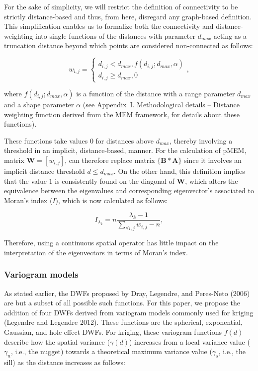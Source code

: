 \documentclass[
]{article}
\begin{document}
For the sake of simplicity, we will restrict the definition of
connectivity to be strictly distance-based and thus, from here,
disregard any graph-based definition. This simplification enables us to
formalize both the connectivity and distance-weighting into single
functions of the distances with parameter \(d_{max}\) acting as a
truncation distance beyond which points are considered non-connected as
follows:

\[
\label{eq3}\tag{3}
w_{i,j} =
  \begin{cases}
    d_{i,j} < d_{max}, f(d_{i,j}; d_{max}, \alpha) \\
    d_{i,j} \geq d_{max}, 0
  \end{cases},
\]

where \(f(d_{i,j}; d_{max}, \alpha)\) is a function of the distance with
a range parameter \(d_{max}\) and a shape parameter \(\alpha\) (see
Appendix~I. Methodological details -- Distance weighting function
derived from the MEM framework, for details about these functions).

These functions take values \(0\) for distances above \(d_{max}\),
thereby involving a threshold in an implicit, distance-based, manner.
For the calculation of pMEM, matrix \(\mathbf{W} = [w_{i,j}]\), can
therefore replace matrix \(\{\mathbf{B*A}\}\) since it involves an
implicit distance threshold \(d \leq d_{max}\). On the other hand, this
definition implies that the value \(1\) is consistently found on the
diagonal of \(\mathbf{W}\), which alters the equivalence between the
eigenvalues and corresponding eigenvector's associated to Moran's index
(\(I\)), which is now calculated as follows:

\[
\label{eq4}\tag{4}
I_{\lambda_k} = n \frac{\lambda_k - 1}{\sum_{\forall i,j} w_{i,j} - n},
\]

Therefore, using a continuous spatial operator has little impact on the
interpretation of the eigenvectors in terms of Moran's index.

\subsubsection{Variogram models}\label{variogram-models}

As stated earlier, the DWFs proposed by Dray, Legendre, and Peres-Neto
(2006) are but a subset of all possible such functions. For this paper,
we propose the addition of four DWFs derived from variogram models
commonly used for kriging (Legendre and Legendre 2012). These functions
are the spherical, exponential, Gaussian, and hole effect DWFs. For
kriging, these variogram functions \(f(d)\) describe how the spatial
variance (\(\gamma(d)\)) increases from a local variance value
(\(\gamma_n\), i.e., the nugget) towards a theoretical maximum variance
value (\(\gamma_s\), i.e., the sill) as the distance increases as
follows:
\end{document}
